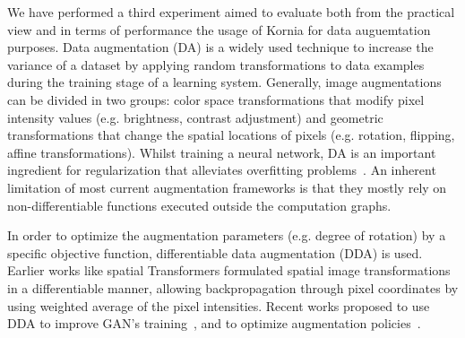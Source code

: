 We have performed a third experiment aimed to evaluate both from the practical view and in terms of performance the usage of Kornia for data auguemtation purposes. Data augmentation (DA) is a widely used technique to increase the variance of a dataset by applying random transformations to data examples during the training stage of a learning system. Generally, image augmentations can be divided in two groups: color space transformations that modify pixel intensity values (e.g. brightness, contrast adjustment) and geometric transformations that change the spatial locations of pixels  (e.g. rotation, flipping, affine transformations). Whilst training a neural network, DA is an important ingredient for regularization that alleviates overfitting problems~\cite{deeplearningbook2016}. An inherent limitation of most current augmentation frameworks is that they mostly rely on non-differentiable functions executed outside the computation graphs.

In order to optimize the augmentation parameters (e.g. degree of rotation) by a specific objective function, differentiable data augmentation (DDA) is used. Earlier works like spatial Transformers \cite{SpatialTransformers2015} formulated spatial image transformations in a differentiable manner, allowing backpropagation through pixel coordinates by using weighted average of the pixel intensities. Recent works proposed to use DDA to improve GAN's training~\citep{zhao2020differentiable}, and to optimize augmentation policies~\citep{hataya2020meta, hataya2019faster}.

